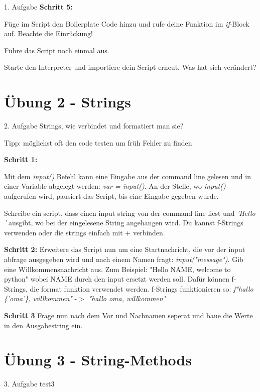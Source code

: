 \begin{frame}{1. Aufgabe}
	\textbf{Schritt 5:}
	
	Füge im Script den Boilerplate Code hinzu und rufe deine Funktion im \textit{if}-Block auf. Beachte die Einrückung!
	
	
	
	Führe das Script noch einmal aus.
	
	Starte den Interpreter und importiere dein Script erneut. Was hat sich verändert?
\end{frame}

\section{Übung 2 - Strings}

\begin{frame}{2. Aufgabe}
	Strings, wie verbindet und formatiert man sie?
	
	Tipp: möglichst oft den code testen um früh Fehler zu finden
	
	\textbf{Schritt 1:}
	
	Mit dem \textit{input()} Befehl kann eine Eingabe aus der command line gelesen und in einer Variable abgelegt werden: \textit{var = input()}. An der Stelle, wo \textit{input()} aufgerufen wird, pausiert das Script, bis eine Eingabe gegeben wurde.
	
	Schreibe ein script, dass einen input string von der command line liest und \textit{'Hello '} ausgibt, wo bei der eingelesene String angehangen wird. Du kannst f-Strings verwenden oder die strings einfach mit + verbinden.
\end{frame}
\begin{frame}
	\textbf{Schritt 2:}
	Erweitere das Script nun um eine Startnachricht, die vor der input abfrage ausgegeben wird und nach einem Namen fragt: \textit{input("message")}. Gib eine Willkommensnachricht aus. Zum Beispiel: "Hello NAME, welcome to python" wobei NAME durch den input ersetzt werden soll. Dafür können f-Strings, die format funktion verwendet werden.
	\linebreak
	f-Strings funktionieren so: \textit{f"hallo \{'oma'\}, willkommen"} -$>$ \textit{"hallo oma, willkommen"}
	\linebreak
	
	\textbf{Schritt 3}	
	Frage nun nach dem Vor und Nachnamen seperat und baue die Werte in den Ausgabestring ein.
\end{frame}


\section{Übung 3 - String-Methods}

\begin{frame}{3. Aufgabe}
	test3
\end{frame}



